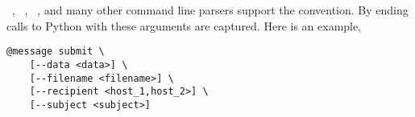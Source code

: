 ~\cite{argparse}, ~\cite{click}, ~\cite{python_fire}, and many other command line parsers support the  convention. By ending calls to Python with  these arguments are captured. Here is an example,
%
\begin{verbatim}
@message submit \
    [--data <data>] \
    [--filename <filename>] \
    [--recipient <host_1,host_2>] \
    [--subject <subject>]
\end{verbatim}